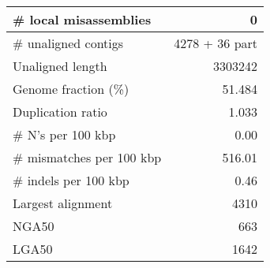 \documentclass[12pt,a4paper]{article}
\begin{document}
\begin{table}[ht]
\begin{center}
\begin{tabular}{|l*{1}{|r}|}
\# local misassemblies & 0 \\ \hline
\# unaligned contigs & 4278 + 36 part \\ \hline
Unaligned length & 3303242 \\ \hline
Genome fraction (\%) & 51.484 \\ \hline
Duplication ratio & 1.033 \\ \hline
\# N's per 100 kbp & 0.00 \\ \hline
\# mismatches per 100 kbp & 516.01 \\ \hline
\# indels per 100 kbp & 0.46 \\ \hline
Largest alignment & 4310 \\ \hline
NGA50 & 663 \\ \hline
LGA50 & 1642 \\ \hline
\end{tabular}
\end{center}
\end{table}
\end{document}
